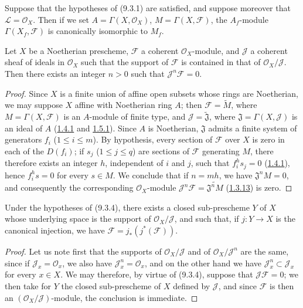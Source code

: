 \begin{corollary}[9.3.3]
\label{I.9.3.3}
Suppose that the hypotheses of (9.3.1) are satisfied, and suppose moreover
that $\mathscr{L}=\mathscr{O}_X$. Then if we set
$A=\Gamma(X,\mathscr{O}_X)$, $M=\Gamma(X,\mathscr{F})$, the $A_f$-module
$\Gamma(X_f,\mathscr{F})$ is canonically isomorphic to $M_f$.
\end{corollary}

\begin{proposition}[9.3.4]
\label{I.9.3.4}
Let $X$ be a Noetherian prescheme, $\mathscr{F}$ a coherent
$\mathscr{O}_X$-module, and $\mathscr{J}$ a coherent sheaf of ideals in
$\mathscr{O}_X$ such that the support of $\mathscr{F}$ is contained in
that of $\mathscr{O}_X/\mathscr{J}$. Then there exists an integer $n>0$
such that $\mathscr{J}^n\mathscr{F}=0$.
\end{proposition}

\begin{proof}
Since $X$ is a finite union of affine open subsets whose rings are
Noetherian, we may suppose $X$ affine with Noetherian ring $A$; then
$\mathscr{F}=\widetilde M$, where $M=\Gamma(X,\mathscr{F})$ is an $A$-module
of finite type, and $\mathscr{J}=\widetilde{\mathfrak{J}}$, where
$\mathfrak{J}=\Gamma(X,\mathscr{J})$ is an ideal of $A$
(\hyperref[I.1.4.1]{1.4.1} and \hyperref[I.1.5.1]{1.5.1}). Since $A$
is Noetherian, $\mathfrak{J}$ admits a finite system of generators $f_i$
($1\leq i\leq m$). By hypothesis, every section of $\mathscr{F}$ over $X$
is zero in each of the $D(f_i)$; if $s_j$ ($1\leq j\leq q$) are sections of
$\mathscr{F}$ generating $M$, there therefore exists an integer $h$,
independent of $i$ and $j$, such that $f_i^h s_j=0$
(\hyperref[I.1.4.1]{1.4.1}), hence $f_i^h s=0$ for every $s\in M$. We
conclude that if $n=mh$, we have $\mathfrak{J}^nM=0$, and consequently the
corresponding $\mathscr{O}_X$-module
$\mathscr{J}^n\mathscr{F}=\widetilde{\mathfrak{J}^nM}$
(\hyperref[I.1.3.13]{1.3.13}) is zero.
\end{proof}

\begin{corollary}[9.3.5]
\label{I.9.3.5}
Under the hypotheses of (9.3.4), there exists a closed sub-prescheme $Y$ of
$X$ whose underlying space is the support of
$\mathscr{O}_X/\mathscr{J}$, and such that, if $j:Y\to X$ is the canonical
injection, we have $\mathscr{F}=j_*(j^*(\mathscr{F}))$.
\end{corollary}

\begin{proof}
Let us note first that the supports of $\mathscr{O}_X/\mathscr{J}$ and of
$\mathscr{O}_X/\mathscr{J}^n$ are the same, since if
$\mathscr{J}_x=\mathscr{O}_x$, we also have
$\mathscr{J}_x^n=\mathscr{O}_x$, and on the other hand we have
$\mathscr{J}_x^n\subset\mathscr{J}_x$ for every $x\in X$. We may therefore,
by virtue of (9.3.4), suppose that $\mathscr{J}\mathscr{F}=0$; we then take
for $Y$ the closed sub-prescheme of $X$ defined by $\mathscr{J}$, and since
$\mathscr{F}$ is then an $(\mathscr{O}_X/\mathscr{J})$-module, the
conclusion is immediate.
\end{proof}

